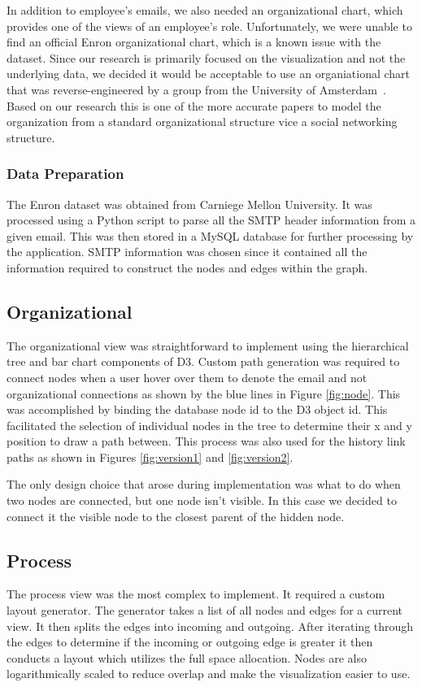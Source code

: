 \documentclass[journal]{vgtc}                %
\begin{document}
In addition to employee's emails, we also needed an organizational chart, which provides one of the views of an employee's role.  Unfortunately, we were unable to find an official Enron organizational chart, which is a known issue with the dataset.  Since our research is primarily focused on the visualization and not the underlying data, we decided it would be acceptable to use an organiational chart that was reverse-engineered by a group from the University of Amsterdam~\cite{rowe2007automated}.  Based on our research this is one of the more accurate papers to model the organization from a standard organizational structure vice a social networking structure.

\subsubsection{Data Preparation}

The Enron dataset was obtained from Carniege Mellon University.  It was processed using a Python script to parse all the SMTP header information from a given email.  This was then stored in a MySQL database for further processing by the application.  SMTP information was chosen since it contained all the information required to construct the nodes and edges within the graph.  

\subsection{Organizational}
The organizational view was straightforward to implement using the hierarchical tree and bar chart components of D3.  Custom path generation was required to connect nodes when a user hover over them to denote the email and not organizational connections as shown by the blue lines in Figure \ref{fig:node}.  This was accomplished by binding the database node id to the D3 object id.  This facilitated the selection of individual nodes in the tree to determine their x and y position to draw a path between.  This process was also used for the history link paths as shown in Figures \ref{fig:version1} and \ref{fig:version2}.

The only design choice that arose during implementation was what to do when two nodes are connected, but one node isn't visible.  In this case we decided to connect it the visible node to the closest parent of the hidden node.

\subsection{Process}
The process view was the most complex to implement.  It required a custom layout generator.  The generator takes a list of all nodes and edges for a current view.  It then splits the edges into incoming and outgoing.  After iterating through the edges to determine if the incoming or outgoing edge is greater it then conducts a layout which utilizes the full space allocation.  Nodes are also logarithmically scaled to reduce overlap and make the visualization easier to use.
\end{document}
